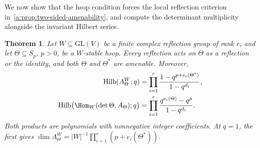 \documentclass[11pt]{amsart}
\newtheorem{theorem}{Theorem}[section]
\theoremstyle{definition}
\DeclareMathOperator{\Hilb}{Hilb}\DeclareMathOperator{\Res}{Res}
\begin{document}
We now show that the hsop condition forces the local reflection
criterion in~\cref{a:prop:two-sided-amenability}, and compute the
determinant multiplicity alongside the invariant Hilbert series.

\begin{theorem}\label{a:thm:automatic}\label{c:prop:hilbert}\label{cor:products}
Let $W\subseteq\mathrm{GL}(V)$ be a finite complex reflection group of
rank $r$, and let $\Theta\subseteq S_p$, $p>0$, be a $W$-stable hsop.
Every reflection acts on $\Theta$ as a reflection or the
identity, and both $\Theta$ and $\Theta^*$ are amenable. Moreover,
\begin{align}
 \Hilb(A_\Theta^W;q)
 &=\prod_{i=1}^r\frac{1-q^{p+e_i(\Theta^*)}}{1-q^{d_i}},\label{a:eq:product}\\
 \Hilb\bigl(\Hom_W(\det\Theta,A_\Theta);q\bigr)
 &=\prod_{i=1}^r\frac{q^{e_i(\Theta)}-q^p}{1-q^{d_i}}.\label{c:eq:det-hilbert}
\end{align}
Both products are polynomials with nonnegative integer coefficients. At
$q=1$, the first gives
$\dim A_\Theta^W=|W|^{-1}\prod_{i=1}^r(p+e_i(\Theta^*))$.
\end{theorem}
\end{document}

